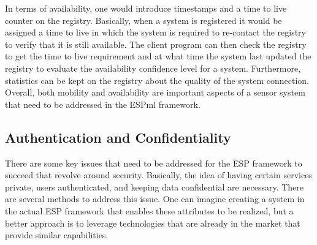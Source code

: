 In terms of availability, one would introduce timestamps and a time to
live counter on the registry.  Basically, when a system is registered
it would be assigned a time to live in which the system is
required to re-contact the registry to verify that it is still
available.  The client program can then check the
registry to get the time to live requirement and at what time the
system last updated the registry to evaluate the availability
confidence level for a system.  Furthermore, statistics can be kept on
the registry about the quality of the system connection.
Overall, both mobility and availability are important aspects of a
sensor system that need to be addressed in the ESPml framework.

\subsection{Authentication and Confidentiality}

There are some key issues that need to be addressed for the ESP framework to
succeed that revolve around security.  Basically, the idea of
having certain services private, users authenticated, and keeping data
confidential are necessary.  There are several methods to address this
issue.  One can imagine creating a system in the actual ESP framework
that enables these attributes to be realized, but a better approach is
to leverage technologies that are already in the market that provide
similar capabilities.

